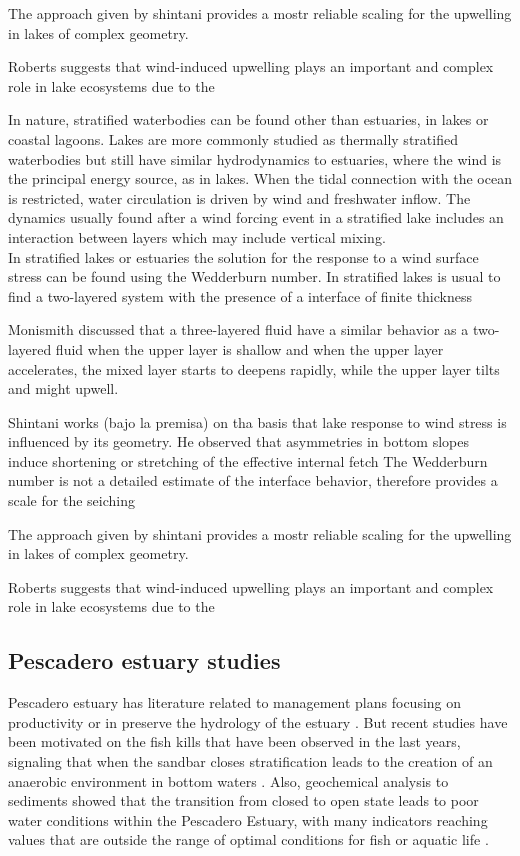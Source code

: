 \documentclass[tesis.tex]{subfiles}
\begin{document}
The approach given by shintani provides a mostr reliable scaling for the upwelling in lakes of complex geometry.

Roberts suggests that wind-induced upwelling plays an important and complex role in lake ecosystems due to the 

In nature, stratified waterbodies can be found other than estuaries, in lakes or coastal lagoons. Lakes are more commonly studied as thermally stratified waterbodies but still have similar hydrodynamics to estuaries, where the wind is the principal energy source, as in lakes. When the tidal connection with the ocean is restricted, water circulation is driven by wind and freshwater inflow. The dynamics usually found after a wind forcing event in a stratified lake includes an interaction between layers which may include vertical mixing. \\

In stratified lakes or estuaries the solution for the response to a wind surface stress can be found using the Wedderburn number.
In stratified lakes is usual to find a two-layered system with the presence of a interface of finite thickness 

Monismith discussed that a three-layered fluid have a similar behavior as a two-layered fluid when the upper layer is shallow and when the upper layer accelerates, the mixed layer starts to deepens rapidly, while the upper layer tilts and might upwell.

Shintani works (bajo la premisa) on tha basis that lake response to wind stress is influenced by its geometry. He observed that asymmetries in bottom slopes induce shortening or stretching of the effective internal fetch
The Wedderburn number is not a detailed estimate of the interface behavior, therefore provides a scale for the seiching

The approach given by shintani provides a mostr reliable scaling for the upwelling in lakes of complex geometry.

Roberts suggests that wind-induced upwelling plays an important and complex role in lake ecosystems due to the 

\subsection{Pescadero estuary studies}

Pescadero estuary has literature related to management plans focusing on productivity \citep{curry1985pescadero} or in preserve the hydrology of the estuary \citep{williams1990pescadero}. But recent studies have been motivated on the fish kills that have been observed in the last years, signaling that when the sandbar closes stratification leads to the creation of an anaerobic environment in bottom waters \citep{sloan2006ecological}. Also, geochemical analysis to sediments showed that the transition from closed to open state leads to poor water conditions within the Pescadero Estuary, with many indicators reaching values that are outside the range of optimal conditions for fish or aquatic life \citep{richards2018}. \\
\end{document}
